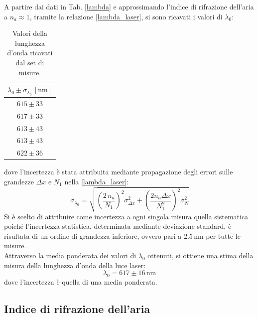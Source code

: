 \documentclass[]{article}
\let\oldsubsection\subsection%
\renewcommand{\subsection}{%
	\renewcommand{\theequation}{\thesubsection.\arabic{equation}}%
	\oldsubsection}%
\begin{document}
A partire dai dati in Tab. \ref{lambda} e approssimando l'indice di rifrazione dell'aria a $n_a \approx 1$, tramite la relazione \ref{lambda_laser}, si sono ricavati i valori di $\lambda_0$:

\begin{table}[H]
    \centering
    
    \begin{tabular}{||c||}
        \hline
        $\lambda_0 \pm \sigma_{\lambda_0} \, \left[\text{nm}\right]$ \\
        \hline\hline

        $615 \pm 33$ \\\hline
        $617 \pm 33$ \\\hline
        $613 \pm 43$ \\\hline
        $613 \pm 43$ \\\hline
        $622 \pm 36$ \\\hline
    
    \end{tabular}
    \caption{Valori della lunghezza d'onda ricavati dal set di misure.}
    \label{tab:lambda}
\end{table}
dove l'incertezza è stata attribuita mediante propagazione degli errori sulle grandezze $\Delta x$ e $N_1$ nella \ref{lambda_laser}:
\begin{equation}
\label{err-lambda}
\sigma_{\lambda_0} = \sqrt{ \left( \frac{2 \, n_a}{N_1}\right)^2 \sigma^2_{\Delta x} +  \left(\frac{2 n_a \Delta x}{N_1^2} \right)^2 \sigma^2_{N} }
\end{equation}
Si è scelto di attribuire come incertezza a ogni singola misura quella sistematica poiché l'incertezza statistica, determinata mediante deviazione standard, è risultata di un ordine di grandezza inferiore, ovvero pari a $2.5 \, \text{nm}$ per tutte le misure. \\
Attraverso la media ponderata dei valori di $\lambda_0$ ottenuti, si ottiene una stima della misura della lunghezza d'onda della luce laser:
\begin{equation}
\label{lambda-value}
\lambda_0 = 617 \pm 16 \, \text{nm}
\end{equation}
dove l'incertezza è quella di una media ponderata.

\subsection{Indice di rifrazione dell'aria}
\end{document}
